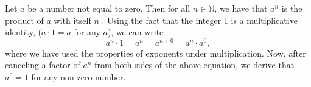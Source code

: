 \documentclass[12pt]{article}
\begin{document}
Let $a$ be a number not equal to zero. Then for all $n \in \mathbb{N}$, we have that $a^n$ is the product of $a$ with itself $n$ . Using the fact that the integer 1 is a multiplicative identity, ($a\cdot 1=a$ for any $a$), we can write
\begin{displaymath}
a^n \cdot 1=a^n=a^{n+0}=a^n\cdot a^0,
\end{displaymath}
where we have used the properties of exponents under multiplication.  Now, after canceling a factor of $a^n$ from both sides of the above equation, we derive that $a^0=1$ for any non-zero number.
\end{document}
